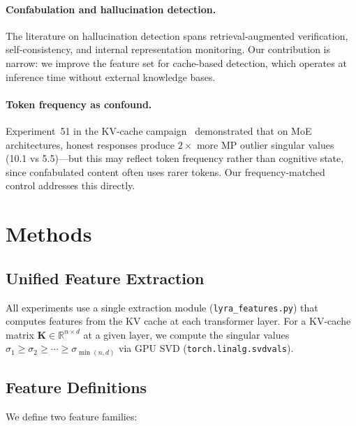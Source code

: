 \documentclass[11pt,a4paper]{article}
\begin{document}
\paragraph{Confabulation and hallucination detection.}
The literature on hallucination detection spans retrieval-augmented
verification, self-consistency, and internal representation
monitoring. Our contribution is narrow: we improve the feature set for
cache-based detection, which operates at inference time without
external knowledge bases.

\paragraph{Token frequency as confound.}
Experiment~51 in the KV-cache campaign~\citep{lyra_wiki} demonstrated
that on MoE architectures, honest responses produce $2\times$ more MP
outlier singular values (10.1 vs 5.5)---but this may reflect token
frequency rather than cognitive state, since confabulated content
often uses rarer tokens. Our frequency-matched control addresses this
directly.

\section{Methods}
\label{sec:methods}

\subsection{Unified Feature Extraction}

All experiments use a single extraction module
(\texttt{lyra\_features.py}) that computes features from the KV cache
at each transformer layer. For a KV-cache matrix
$\mathbf{K} \in \mathbb{R}^{n \times d}$ at a given layer, we
compute the singular values
$\sigma_1 \geq \sigma_2 \geq \cdots \geq \sigma_{\min(n,d)}$ via GPU
SVD (\texttt{torch.linalg.svdvals}).

\subsection{Feature Definitions}

We define two feature families:
\end{document}
